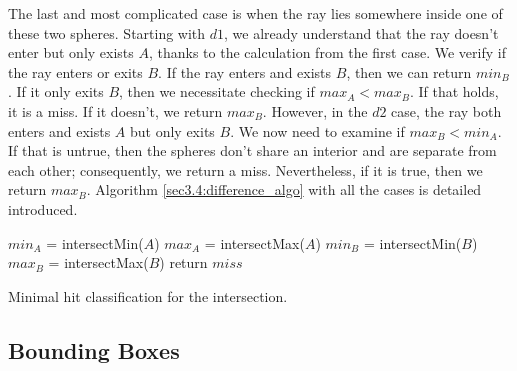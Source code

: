 \documentclass[a4paper,11pt,oneside]{article}
\begin{document}
The last and most complicated case is when the ray lies somewhere inside one of these two spheres. Starting with $d1$, we already understand that the ray doesn't enter but only exists $A$, thanks to the calculation from the first case. We verify if the ray enters or exits $B$. If the ray enters and exists $B$, then we can return $min_B$. If it only exits $B$, then we necessitate checking if $max_A < max_B$. If that holds, it is a miss. If it doesn't, we return $max_B$. However, in the $d2$ case, the ray both enters and exists $A$ but only exits $B$. We now need to examine if $max_B < min_A$. If that is untrue, then the spheres don't share an interior and are separate from each other; consequently, we return a miss. Nevertheless, if it is true, then we return $max_B$. Algorithm \ref{sec3.4:difference_algo} with all the cases is detailed introduced. 

\begin{algorithm}
	\SetAlgoLined
	$min_A$ = intersectMin($A$)\;
	$max_A$ = intersectMax($A$)\;
	$min_B$ = intersectMin($B$)\;
	$max_B$ = intersectMax($B$)\;
	return $miss$\;
	\caption{Minimal hit classification for the intersection.}
	\label{sec3.4:difference_algo}
\end{algorithm} 


\subsection{Bounding Boxes}
\end{document}

